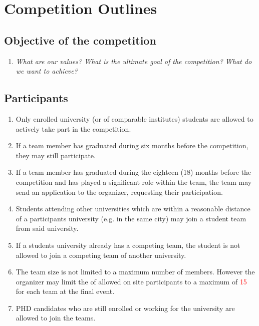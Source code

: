 
\newpage

 \section{Competition Outlines}
  
\subsection{Objective of the competition}
   \begin{enumerate}
      \item \emph{What are our values? What is the ultimate goal of the competition? What do we want to achieve?}
    \end{enumerate}


    \subsection{Participants}
    \begin{enumerate}
      \item Only enrolled university (or of comparable institutes) students are allowed to actively take part in the competition.
      \item If a team member has graduated during six months before the competition, they may still participate.
      \item If a team member has graduated during the eighteen (18) months before the competition and has played a significant role within the team,
      the team may send an application to the organizer, requesting their participation. 
      \item Students attending other universities which are within a reasonable distance of a participants university (e.g. in the same city) may join
      a student team from said university.
      \item If a students university already has a competing team, the student is not allowed to join a competing team of 
      another university.  
      \item The team size is not limited to a maximum number of members. However the organizer may limit the of allowed on site participants to a maximum of \textcolor{red}{15} for each team at the final event.
      \item PHD candidates who are still enrolled or working for the university are allowed to join the teams. 
    \end{enumerate}

